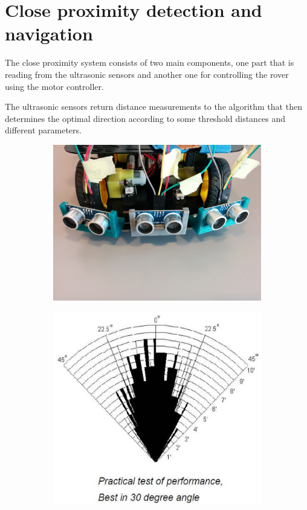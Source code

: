 \clearpage
\section{Close proximity detection and navigation}
The close proximity system consists of two main components, one part that is reading from the ultrasonic sensors and another one for controlling the rover using the motor controller.

The ultrasonic sensors return distance measurements to the algorithm that then determines the optimal direction according to some threshold distances and different parameters.

\begin{figure}[H]
	\centering
	\begin{subfigure}[H]{0.4\textwidth}
		\includegraphics[width=\textwidth]{images/mounted_ultrasonic_sensors.jpg}
		\label{fig:mounted_ultrasonicsensors}
	\end{subfigure}%
	\quad
	\begin{subfigure}[H]{0.4\textwidth}
		\includegraphics[width=\textwidth]{images/hcsr04angle.png}

\end{subfigure}
\end{figure}
